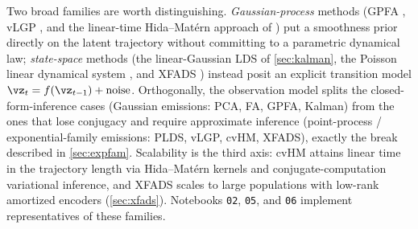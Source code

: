 \documentclass[11pt]{article}
\theoremstyle{plain}
\theoremstyle{definition}
\theoremstyle{remark}
\theoremstyle{definition}
\begin{document}
Two broad families are worth distinguishing. \emph{Gaussian-process} methods
(GPFA \parencite{Yu2009-qp}, vLGP \parencite{Zhao2016a}, and the linear-time
Hida--Mat\'ern approach of \parencite{Dowling2023c}) put a smoothness prior
directly on the latent trajectory without committing to a parametric dynamical
law; \emph{state-space} methods (the linear-Gaussian LDS of \cref{sec:kalman},
the Poisson linear dynamical system \parencite{Macke2011-ep}, and XFADS
\parencite{Dowling2024-xfads}) instead posit an explicit transition model
$\vz_t = f(\vz_{t-1}) + \text{noise}$. Orthogonally, the observation model splits
the closed-form-inference cases (Gaussian emissions: PCA, FA, GPFA, Kalman) from
the ones that lose conjugacy and require approximate inference (point-process /
exponential-family emissions: PLDS, vLGP, cvHM, XFADS), exactly the break
described in \cref{sec:expfam}. Scalability is the third axis: cvHM
\parencite{Dowling2023c} attains linear time in the trajectory length via
Hida--Mat\'ern kernels and conjugate-computation variational inference, and
XFADS scales to large populations with low-rank amortized encoders
(\cref{sec:xfads}). Notebooks \texttt{02}, \texttt{05}, and \texttt{06} implement
representatives of these families.
\end{document}
